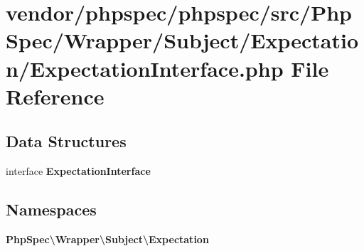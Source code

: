 \section{vendor/phpspec/phpspec/src/\+Php\+Spec/\+Wrapper/\+Subject/\+Expectation/\+Expectation\+Interface.php File Reference}
\label{_expectation_interface_8php}
\subsection*{Data Structures}
\begin{DoxyCompactItemize}
\item 
interface {\bf Expectation\+Interface}
\end{DoxyCompactItemize}
\subsection*{Namespaces}
\begin{DoxyCompactItemize}
\item 
 {\bf Php\+Spec\textbackslash{}\+Wrapper\textbackslash{}\+Subject\textbackslash{}\+Expectation}
\end{DoxyCompactItemize}
